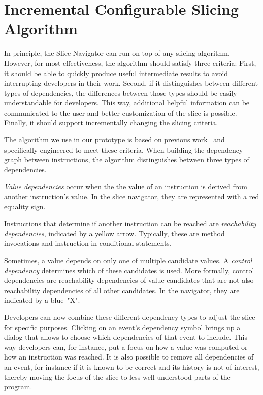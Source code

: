 \section{Incremental Configurable Slicing Algorithm}

\tmpStart
In principle, the Slice Navigator can run on top of any slicing algorithm.
However, for most effectiveness, the algorithm should satisfy three criteria:
First, it should be able to quickly produce useful intermediate results to avoid interrupting developers in their work.
Second, if it distinguishes between different types of dependencies, the differences between those types should be easily understandable for developers.
This way, additional helpful information can be communicated to the user and better customization of the slice is possible.
Finally, it should support incrementally changing the slicing criteria.

The algorithm we use in our prototype is based on previous work~\cite{treffer_dynamic_2014} and specifically engineered to meet these criteria.
When building the dependency graph between instructions, the algorithm distinguishes between three types of dependencies.

\emph{Value dependencies} occur when the the value of an instruction is derived from another instruction's value.
In the slice navigator, they are represented with a red equality sign.

Instructions that determine if another instruction can be reached are \emph{reachability dependencies}, indicated by a yellow arrow.
Typically, these are method invocations and instruction in conditional statements.

Sometimes, a value depends on only one of multiple candidate values. 
A \emph{control dependency} determines which of these candidates is used.
More formally, control dependencies are reachability dependencies of value candidates that are not also reachability dependencies of all other candidates.
In the navigator, they are indicated by a blue~"X".

Developers can now combine these different dependency types to adjust the slice for specific purposes.
Clicking on an event's dependency symbol brings up a dialog that allows to choose which dependencies of that event to include.
This way developers can, for instance, put a focus on how a value was computed or how an instruction was reached.
It is also possible to remove all dependencies of an event, for instance if it is known to be correct and its history is not of interest, thereby moving the focus of the slice to less well-understood parts of the program.

